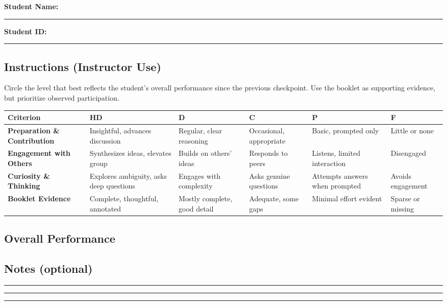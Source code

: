 \noindent\textbf{Student Name:} \rule{0.45\textwidth}{0.4pt}
\hfill
\textbf{Student ID:} \rule{0.2\textwidth}{0.4pt}

\vspace{0.75em}

\subsection*{Instructions (Instructor Use)}
Circle the level that best reflects the student's overall performance since the previous checkpoint. Use the booklet as supporting evidence, but prioritize observed participation.

\vspace{0.75em}

\renewcommand{\arraystretch}{1.4}
{\scriptsize
\begin{tabularx}{\textwidth}{|X|X|X|X|X|X|}
\hline
\textbf{Criterion} & \textbf{HD} & \textbf{D} & \textbf{C} & \textbf{P} & \textbf{F} \\
\hline

\textbf{Preparation \& Contribution} &
Insightful, advances discussion &
Regular, clear reasoning &
Occasional, appropriate &
Basic, prompted only &
Little or none \\
\hline

\textbf{Engagement with Others} &
Synthesizes ideas, elevates group &
Builds on others' ideas &
Responds to peers &
Listens, limited interaction &
Disengaged \\
\hline

\textbf{Curiosity \& Thinking} &
Explores ambiguity, asks deep questions &
Engages with complexity &
Asks genuine questions &
Attempts answers when prompted &
Avoids engagement \\
\hline

\textbf{Booklet Evidence} &
Complete, thoughtful, annotated &
Mostly complete, good detail &
Adequate, some gaps &
Minimal effort evident &
Sparse or missing \\
\hline

\end{tabularx}
}

\vspace{1em}

\subsection*{Overall Performance}
\vspace{0.5em}

\noindent
{} \hspace{1em}
 \hspace{1em}
 \hspace{1em}
 \hspace{1em}

\vspace{1.5em}

\subsection*{Notes (optional)}
\vspace{3em}
\noindent\rule{\textwidth}{0.4pt}

\vspace{1em}
\noindent\rule{\textwidth}{0.4pt}

\vspace{1em}
\noindent\rule{\textwidth}{0.4pt}